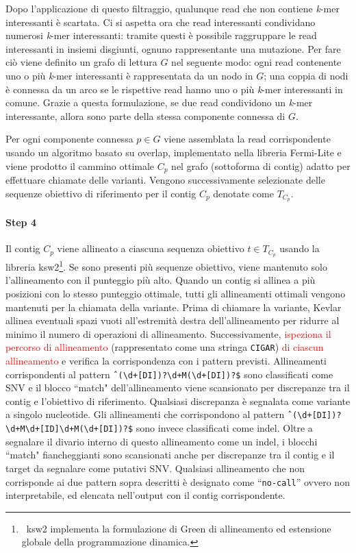 \documentclass[../main.tex]{subfiles}
\begin{document}
Dopo l'applicazione di questo filtraggio, qualunque read che non contiene \textit{k}-mer interessanti è scartata. Ci si aspetta ora che read interessanti condividano numerosi \textit{k}-mer interessanti: tramite questi è possibile raggruppare le read interessanti in insiemi disgiunti, ognuno rappresentante una mutazione. Per fare ciò viene definito un grafo di lettura $G$ nel seguente modo: ogni read contenente uno o più \textit{k}-mer interessanti è rappresentata da un nodo in $G$; una coppia di nodi è connessa da un arco se le rispettive read hanno uno o più \textit{k}-mer interessanti in comune. Grazie a questa formulazione, se due read condividono un \textit{k}-mer interessante, allora sono parte della stessa componente connessa di $G$. 

Per ogni componente connessa $p\in G$ viene assemblata la read corrispondente usando un algoritmo basato su overlap, implementato nella libreria Fermi-Lite e viene prodotto il cammino ottimale $C_p$ nel grafo (sottoforma di contig) adatto per effettuare chiamate delle varianti. Vengono successivamente selezionate delle sequenze obiettivo di riferimento per il contig $C_p$ denotate come $T_{C_p}$.

\paragraph{Step 4} Il contig $C_p$ viene allineato a ciascuna sequenza obiettivo $t \in T_{C_p}$ usando la libreria ksw2\footnote{\ ksw2 implementa la formulazione di Green di allineamento ed estensione globale della programmazione dinamica.}. 
Se sono presenti più sequenze obiettivo, viene mantenuto solo l'allineamento con il punteggio più alto. Quando un contig si allinea a più posizioni con lo stesso punteggio ottimale, tutti gli allineamenti ottimali vengono mantenuti per la chiamata della variante.
Prima di chiamare la variante, Kevlar allinea eventuali spazi vuoti all'estremità destra dell'allineamento per ridurre al minimo il numero di operazioni di allineamento. Successivamente, \textcolor{red}{ispeziona il percorso di allineamento} (rappresentato come una stringa \texttt{CIGAR}) \textcolor{red}{di ciascun allineamento} e verifica la corrispondenza con i pattern previsti. Allineamenti corrispondenti al pattern \verb|ˆ(\d+[DI])?\d+M(\d+[DI])?$| sono classificati come SNV e il blocco ``match" dell'allineamento viene scansionato per discrepanze tra il contig e l'obiettivo di riferimento. Qualsiasi discrepanza è segnalata come variante a singolo nucleotide. Gli allineamenti che corrispondono al pattern \verb|ˆ(\d+[DI])?\d+M\d+[ID]\d+M(\d+[DI])?$| sono invece classificati come indel. Oltre a segnalare il divario interno di questo allineamento come un indel, i blocchi ``match" fiancheggianti sono
scansionati anche per discrepanze tra il contig e il target da segnalare come putativi SNV. Qualsiasi allineamento che non corrisponde ai due pattern sopra descritti è designato come ``\texttt{no-call}'' ovvero non interpretabile, ed elencata nell'output con il contig corrispondente. 
\end{document}

